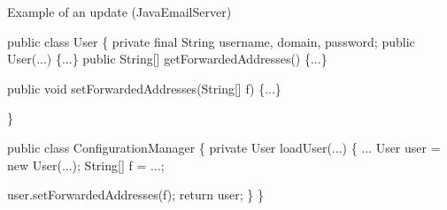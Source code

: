 \newcommand{\ExampleCodeSize}{footnotesize}


\begin{frame}[fragile,shrink=5]{Example of an update (JavaEmailServer)}%
\begin{\ExampleCodeSize}
\begin{semiverbatim}
  public class User \{
    private final String username, domain, password;
    public User(...) \{...\}
    public String[] getForwardedAddresses() \{...\}

    public void setForwardedAddresses(String[] f) \{...\}

  \}

  public class ConfigurationManager \{
    private User loadUser(...) \{
       ...
       User user = new User(...);
       String[] f = ...;

       user.setForwardedAddresses(f);
       return user;
    \}
  \}
\end{semiverbatim}
\end{\ExampleCodeSize}
\end{frame}


% 
% 


